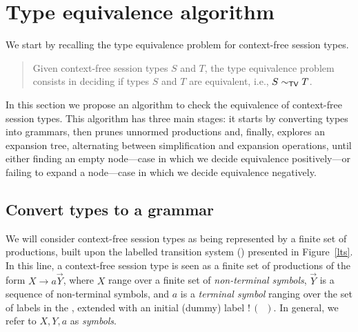 \section{Type equivalence algorithm}
\label{sec:algorithm}

We start by recalling the type equivalence problem for context-free 
session types.

\begin{quote}
  Given context-free session types $S$ and $T$, the type equivalence
  problem consists in deciding if types $S$ and $T$ are equivalent,
  i.e., $S \sim_{\mathsf{TV}} T$.
\end{quote}

In this section we propose an algorithm to check the equivalence of 
context-free session types. This algorithm has three main stages: 
it starts by converting types into grammars, then prunes unnormed 
productions and, finally, explores an expansion tree, alternating 
between simplification and expansion operations, until either finding 
an empty node---case in which we decide equivalence positively---or 
failing to expand a node---case in which we decide equivalence negatively.

\subsection{Convert types to a grammar}
\label{subsec:typeToGrammar}

We will consider context-free session types as being represented by a 
finite set of productions, built upon the labelled transition system (\LTS)
presented in Figure~\ref{lts}. In this line, a context-free session type 
is seen as a finite set of productions of the form $X\rightarrow a \vec Y$, 
where $X$ range over a finite set of \emph{non-terminal symbols}, $\vec Y$ 
is a sequence of non-terminal symbols, and $a$ is a \emph{terminal symbol}
ranging over the set of labels in the \LTS, extended with an initial (dummy) 
label $!\,(\enspace)$. In general, we refer to $X, Y, a$ as \emph{symbols}.

